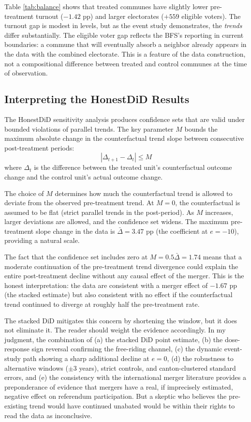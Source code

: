 \documentclass[12pt]{article}
\begin{document}
Table \ref{tab:balance} shows that treated communes have slightly lower pre-treatment turnout ($-1.42$ pp) and larger electorates ($+559$ eligible voters). The turnout gap is modest in levels, but as the event study demonstrates, the \textit{trends} differ substantially. The eligible voter gap reflects the BFS's reporting in current boundaries: a commune that will eventually absorb a neighbor already appears in the data with the combined electorate. This is a feature of the data construction, not a compositional difference between treated and control communes at the time of observation.

\subsection{Interpreting the HonestDiD Results}

The HonestDiD sensitivity analysis produces confidence sets that are valid under bounded violations of parallel trends. The key parameter $M$ bounds the maximum absolute change in the counterfactual trend slope between consecutive post-treatment periods:
$$
|\Delta_{t+1} - \Delta_t| \leq M
$$
where $\Delta_t$ is the difference between the treated unit's counterfactual outcome change and the control unit's actual outcome change.

The choice of $M$ determines how much the counterfactual trend is allowed to deviate from the observed pre-treatment trend. At $M = 0$, the counterfactual is assumed to be flat (strict parallel trends in the post-period). As $M$ increases, larger deviations are allowed, and the confidence set widens. The maximum pre-treatment slope change in the data is $\bar{\Delta} = 3.47$ pp (the coefficient at $e = -10$), providing a natural scale.

The fact that the confidence set includes zero at $M = 0.5\bar{\Delta} = 1.74$ means that a moderate continuation of the pre-treatment trend divergence could explain the entire post-treatment decline without any causal effect of the merger. This is the honest interpretation: the data are consistent with a merger effect of $-1.67$ pp (the stacked estimate) but also consistent with no effect if the counterfactual trend continued to diverge at roughly half the pre-treatment rate.

The stacked DiD mitigates this concern by shortening the window, but it does not eliminate it. The reader should weight the evidence accordingly. In my judgment, the combination of (a) the stacked DiD point estimate, (b) the dose-response sign reversal confirming the free-riding channel, (c) the dynamic event-study path showing a sharp additional decline at $e = 0$, (d) the robustness to alternative windows ($\pm 3$ years), strict controls, and canton-clustered standard errors, and (e) the consistency with the international merger literature provides a preponderance of evidence that mergers have a real, if imprecisely estimated, negative effect on referendum participation. But a skeptic who believes the pre-existing trend would have continued unabated would be within their rights to read the data as inconclusive.
\end{document}
